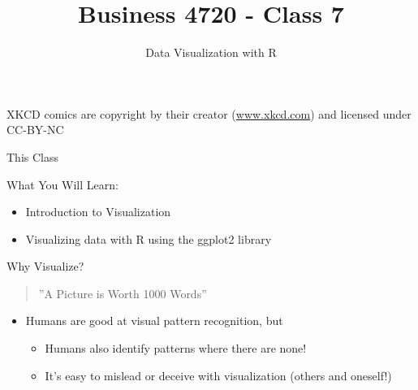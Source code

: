\documentclass[ignorenonframetext,xcolor=x11names]{beamer}
\title{Business 4720 - Class 7}
\subtitle{Data Visualization with R}
\begin{document}
\begin{frame}{}
  \titlepage
  \footnotesize 
   
  
XKCD comics are copyright by their creator (\url{www.xkcd.com}) and licensed under CC-BY-NC
\end{frame}

\begin{frame}{This Class}

\begin{block}{What You Will Learn:}
\begin{itemize}
  \item Introduction to Visualization
  \item Visualizing data with R using the ggplot2 library
\end{itemize}
\end{block}
\end{frame}


\begin{frame}{Why Visualize?}
  \begin{quote} \large \centering
    ''A Picture is Worth 1000 Words''
  \end{quote}
  
\begin{itemize}
  \item Humans are good at visual pattern recognition, but
  \begin{itemize}
    \item Humans also identify patterns where there are none!
    \item It's easy to mislead or deceive with visualization (others and oneself!)
  \end{itemize}
\end{itemize}
\end{frame}
\end{document}
